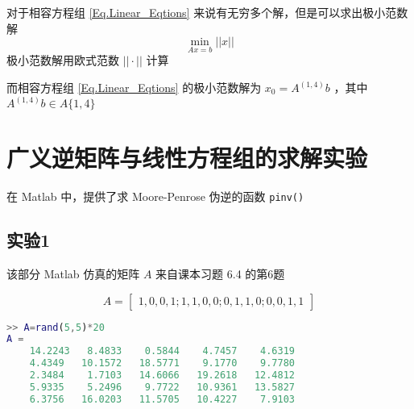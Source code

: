 对于相容方程组 \ref{Eq.Linear_Eqtions} 来说有无穷多个解，但是可以求出极小范数解
\begin{equation}
    \min\limits_{Ax=b}||x||
\end{equation}
极小范数解用欧式范数 $||\cdot||$ 计算

而相容方程组 \ref{Eq.Linear_Eqtions} 的极小范数解为 $x_0=A^{(1,4)}b$ ，其中$A^{(1,4)}b\in A\{1,4\}$

\section{广义逆矩阵与线性方程组的求解实验}

在 Matlab 中，提供了求 Moore-Penrose 伪逆的函数 \lstinline|pinv()| 

\subsection{实验1}
该部分 Matlab 仿真的矩阵 $A$ 来自课本习题 6.4 的第6题

\begin{equation}
    A=\begin{bmatrix}
        1, 0, 0, 1;
    1, 1, 0, 0;
    0, 1, 1, 0;
    0, 0, 1, 1
    \end{bmatrix}
\end{equation}


\begin{lstlisting}[language=Matlab]  
>> A=rand(5,5)*20
A =
    14.2243   8.4833    0.5844    4.7457    4.6319
    4.4349   10.1572   18.5771    9.1770    9.7780
    2.3484    1.7103   14.6066   19.2618   12.4812
    5.9335    5.2496    9.7722   10.9361   13.5827
    6.3756   16.0203   11.5705   10.4227    7.9103
\end{lstlisting}
